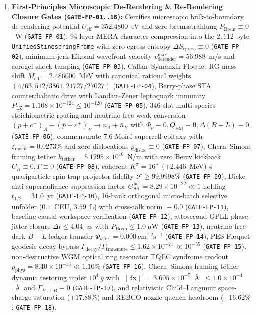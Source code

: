 \documentclass[11pt,onecolumn]{article}
\begin{document}
\begin{enumerate}
    \item \textbf{First-Principles Microscopic De-Rendering \& Re-Rendering Closure Gates (\texttt{GATE-}\allowbreak\texttt{FP-01..18}):} Certifies microscopic bulk-to-boundary de-rendering potential $U_{\text{eff}} = 352.4800$~eV and zero bremsstrahlung $P_{\text{Brem}} \equiv 0$~W (\texttt{GATE-FP-01}), 94-layer MERA character compression into the $2{,}112$-byte \texttt{UnifiedStinespringFrame} with zero egress entropy $\Delta S_{\text{egress}} \equiv 0$ (\texttt{GATE-FP-02}), minimum-jerk Eikonal wavefront velocity $v_{\text{derender}}^{\max} = 56.988$~m/s and aerogel shock tamping (\texttt{GATE-FP-03}), Callan--Symanzik Floquet RG mass shift $M_{\text{eff}} = 2.486000$~MeV with canonical rational weights $(4/63, 512/3861, 21727/27027)$ (\texttt{GATE-FP-04}), Berry-phase STA counterdiabatic drive with Landau--Zener leptoquark immunity $P_{\text{LZ}} = 1.108\times 10^{-124} \le 10^{-120}$ (\texttt{GATE-FP-05}), 346-slot multi-species stoichiometric routing and neutrino-free weak conversion $(p+e^-)_A + (\bar{p}+e^+)_B \to n_A + \bar{n}_B$ with $\Phi_\nu \equiv 0, Q_{\text{EM}} \equiv 0, \Delta(B-L) \equiv 0$ (\texttt{GATE-FP-06}), commensurate 7:6 Moir\'e supercell epitaxy with $\varepsilon_{\text{misfit}} = 0.0273\%$ and zero dislocations $\rho_{\text{disloc}} \equiv 0$ (\texttt{GATE-FP-07}), Chern--Simons framing tether $k_{\text{tether}} = 5.1295\times 10^{10}$~N/m with zero Berry kickback $C_{\bar B} \equiv 0, \Gamma \equiv 0$ (\texttt{GATE-FP-08}), coherent $K^\pi = 16^+$ ($+2.446$~MeV) 4-quasiparticle spin-trap projector fidelity $\mathcal{F} \ge 99.9998\%$ (\texttt{GATE-FP-09}), Dicke anti-superradiance suppression factor $G_{\text{SR}}^{\text{net}} = 8.29\times 10^{-22} \ll 1$ holding $t_{1/2} = 31.0$~yr (\texttt{GATE-FP-10}), 16-bank orthogonal micro-batch selective unfolder ($0.1$~CEU, $3.59$~L) with cross-talk norm $\equiv 0.0$ (\texttt{GATE-FP-11}), baseline causal workspace verification (\texttt{GATE-FP-12}), attosecond OPLL phase-jitter closure $\Delta t \le 4.04$~as with $P_{\text{Brem}} \le 1.0~\mu\text{W}$ (\texttt{GATE-FP-13}), neutrino-free dark $B-L$ ledger transfer $\Phi_{\nu,\text{vis}} = 0.000~\text{cm}^{-2}\text{s}^{-1}$ (\texttt{GATE-FP-14}), PES Floquet geodesic decay bypass $\Gamma_{\text{decay}}/\Gamma_{\text{transmute}} \le 1.62\times 10^{-71} \ll 10^{-35}$ (\texttt{GATE-FP-15}), non-destructive WGM optical ring resonator TQEC syndrome readout $p_{\text{phys}} = 8.40\times 10^{-13} \ll 1.10\%$ (\texttt{GATE-FP-16}), Chern--Simons framing tether dynamic restoring under $10^4~g$ with $\|\delta\mathbf{x}\| = 3.605\times 10^{-5}$~\AA\ $\le 1.0\times 10^{-4}$~\AA\ and $\Gamma_{\bar B \to B} \equiv 0$ (\texttt{GATE-FP-17}), and relativistic Child--Langmuir space-charge saturation ($+17.88\%$) and REBCO nozzle quench headroom ($+16.62\%$; \texttt{GATE-FP-18}).

\end{enumerate}
\end{document}
